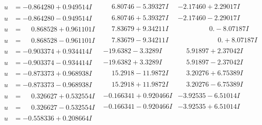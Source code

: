 \documentclass[1p]{elsarticle_modified}
\theoremstyle{definition}
\begin{document}
$$\begin{array}{c|c|c}
 \hline 
\begin{aligned}
u &= -0.864280 + 0.949514 I\end{aligned}
 & \phantom{-}6.80746 - 5.39327 I & -2.17460 + 2.29017 I \\ \hline\begin{aligned}
u &= -0.864280 - 0.949514 I\end{aligned}
 & \phantom{-}6.80746 + 5.39327 I & -2.17460 - 2.29017 I \\ \hline\begin{aligned}
u &= \phantom{-}0.868528 + 0.961101 I\end{aligned}
 & \phantom{-}7.83679 + 9.34211 I & \phantom{-0.000000 } 0. - 8.07187 I \\ \hline\begin{aligned}
u &= \phantom{-}0.868528 - 0.961101 I\end{aligned}
 & \phantom{-}7.83679 - 9.34211 I & \phantom{-0.000000 -}0. + 8.07187 I \\ \hline\begin{aligned}
u &= -0.903374 + 0.934414 I\end{aligned}
 & -19.6382 - 3.3289 I & \phantom{-}5.91897 + 2.37042 I \\ \hline\begin{aligned}
u &= -0.903374 - 0.934414 I\end{aligned}
 & -19.6382 + 3.3289 I & \phantom{-}5.91897 - 2.37042 I \\ \hline\begin{aligned}
u &= -0.873373 + 0.968938 I\end{aligned}
 & \phantom{-}15.2918 - 11.9872 I & \phantom{-}3.20276 + 6.75389 I \\ \hline\begin{aligned}
u &= -0.873373 - 0.968938 I\end{aligned}
 & \phantom{-}15.2918 + 11.9872 I & \phantom{-}3.20276 - 6.75389 I \\ \hline\begin{aligned}
u &= \phantom{-}0.326627 + 0.532554 I\end{aligned}
 & -0.166341 + 0.920466 I & -3.92535 - 6.51014 I \\ \hline\begin{aligned}
u &= \phantom{-}0.326627 - 0.532554 I\end{aligned}
 & -0.166341 - 0.920466 I & -3.92535 + 6.51014 I \\ \hline\begin{aligned}
u &= -0.558336 + 0.208664 I\end{aligned}

\end{array}$$
\end{document}
